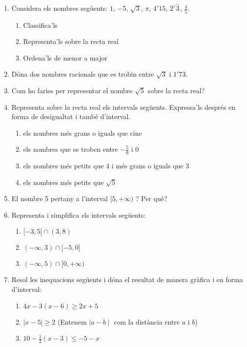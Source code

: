 \documentclass{article}
\begin{document}
	\author{Mireia Dosil}
	\date{text}


\begin{enumerate}
 
\item Considera els nombres següents: $1$, $-5$, $\sqrt{3}$, $\pi$, $4'15$, $2'\stackrel\frown{3}$, $\frac{4}{5}$.
\begin{enumerate}
	\item Classifica'ls
	\item Representa'ls sobre la recta real
	\item Ordena'ls de menor a major
\end{enumerate}

\item Dóna dos nombres racionals que es trobin entre $\sqrt{3}$ i $1'73$.
\item Com ho faries per representar el nombre $\sqrt{5}$ sobre la recta real?



\item Representa sobre la recta real els intervals següents. Expressa'ls després en forma de desigualtat i també d'interval.

\begin{enumerate}
\item els nombres més grans o iguals que cinc
\item els nombres que es troben entre $-\frac{5}{6}$ i 0
\item els nombres més petits que 4 i més grans o iguals que 3
\item els nombres més petits que $\sqrt{5}$
\end{enumerate}

\item El nombre 5 pertany a l'interval $\lbrack 5, + \infty) $ ? Per què?
\item Representa i simplifica els intervals següents:

\begin{enumerate}
\item $\lbrack -3, 5 \rbrack \cap (3, 8)$
\item $(- \infty, 3) \cap \lbrack -5, 0 \rbrack$
\item $(- \infty, 5) \cap \lbrack 0, + \infty)$
\end{enumerate}


\item Resol les inequacions següents i dóna el resultat de manera gràfica i en forma d'interval:

\begin{enumerate}
\item $4x-3(x-6) \ge 2x+5$
\item $\mid x-5 \mid \ge 2$ \tiny{ (Entenem $\mid a - b\mid$ com la distància entre $a$ i $b$) }
\normalsize
\item $10 - \frac{1}{2} (x-3) \le -5 -x$



\end{enumerate}

\end{enumerate}
 
\end{document}
